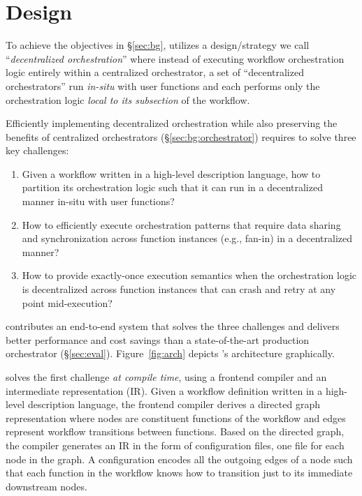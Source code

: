 \section{Design}

To achieve the objectives in \S\ref{sec:bg}, \name{} utilizes a
design/strategy we call ``\emph{decentralized orchestration}'' where instead
of executing workflow orchestration logic entirely within a centralized
orchestrator, a set of ``decentralized orchestrators'' run \emph{in-situ} with
user functions and each performs only the orchestration logic \emph{local to
its subsection} of the workflow.

Efficiently implementing decentralized orchestration while also preserving the
benefits of centralized orchestrators (\S\ref{sec:bg:orchestrator}) requires
\name{} to solve three key challenges:

\begin{enumerate}

	\item Given a workflow written in a high-level description language, how
	to partition its orchestration logic such that it can run in a
	decentralized manner in-situ with user functions?

	\item How to efficiently execute orchestration patterns that require data
	sharing and synchronization across function instances (e.g., fan-in) in a
	decentralized manner?

	\item How to provide exactly-once execution semantics when the
	orchestration logic is decentralized across function instances that can
	crash and retry at any point mid-execution?

\end{enumerate}

\name{} contributes an end-to-end system that solves the three challenges and
delivers better performance and cost savings than a state-of-the-art
production orchestrator (\S\ref{sec:eval}). Figure~\ref{fig:arch} depicts
\name{}'s architecture graphically.

\name{} solves the first challenge \emph{at compile time}, using a frontend
compiler and an intermediate representation (IR). Given a workflow definition
written in a high-level description language, the frontend compiler derives a
directed graph representation where nodes are constituent functions of the
workflow and edges represent workflow transitions between
functions. Based on the directed graph, the compiler generates an IR in
the form of configuration files, one file for each node in the graph. A
\name{} configuration encodes all the outgoing edges of a node such that each
function in the workflow knows how to transition just to its immediate
downstream nodes.

